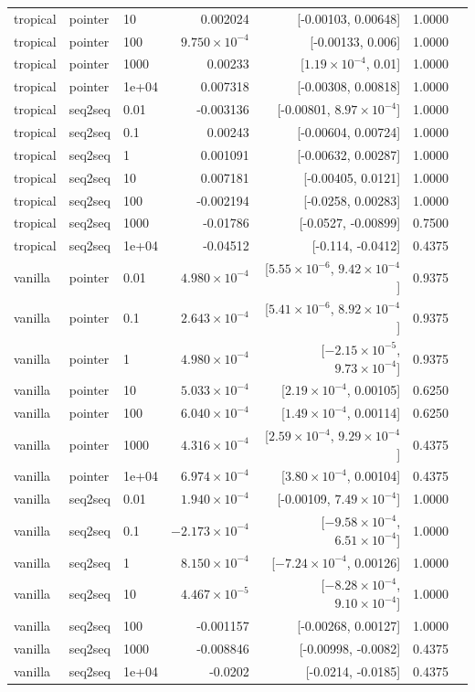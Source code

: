 \documentclass[10pt]{article}
\begin{document}
{\begin{longtable}{lllrrrl}
tropical & pointer & 10 & 0.002024 & [-0.00103, 0.00648] & 1.0000 & \\
tropical & pointer & 100 & $9.750\times10^{-4}$ & [-0.00133, 0.006] & 1.0000 & \\
tropical & pointer & 1000 & 0.00233 & [$1.19\times10^{-4}$, 0.01] & 1.0000 & \\
tropical & pointer & 1e+04 & 0.007318 & [-0.00308, 0.00818] & 1.0000 & \\
tropical & seq2seq & 0.01 & -0.003136 & [-0.00801, $8.97\times10^{-4}$] & 1.0000 & \\
tropical & seq2seq & 0.1 & 0.00243 & [-0.00604, 0.00724] & 1.0000 & \\
tropical & seq2seq & 1 & 0.001091 & [-0.00632, 0.00287] & 1.0000 & \\
tropical & seq2seq & 10 & 0.007181 & [-0.00405, 0.0121] & 1.0000 & \\
tropical & seq2seq & 100 & -0.002194 & [-0.0258, 0.00283] & 1.0000 & \\
tropical & seq2seq & 1000 & -0.01786 & [-0.0527, -0.00899] & 0.7500 & \\
tropical & seq2seq & 1e+04 & -0.04512 & [-0.114, -0.0412] & 0.4375 & \\
vanilla & pointer & 0.01 & $4.980\times10^{-4}$ & [$5.55\times10^{-6}$, $9.42\times10^{-4}$] & 0.9375 & \\
vanilla & pointer & 0.1 & $2.643\times10^{-4}$ & [$5.41\times10^{-6}$, $8.92\times10^{-4}$] & 0.9375 & \\
vanilla & pointer & 1 & $4.980\times10^{-4}$ & [$-2.15\times10^{-5}$, $9.73\times10^{-4}$] & 0.9375 & \\
vanilla & pointer & 10 & $5.033\times10^{-4}$ & [$2.19\times10^{-4}$, 0.00105] & 0.6250 & \\
vanilla & pointer & 100 & $6.040\times10^{-4}$ & [$1.49\times10^{-4}$, 0.00114] & 0.6250 & \\
vanilla & pointer & 1000 & $4.316\times10^{-4}$ & [$2.59\times10^{-4}$, $9.29\times10^{-4}$] & 0.4375 & \\
vanilla & pointer & 1e+04 & $6.974\times10^{-4}$ & [$3.80\times10^{-4}$, 0.00104] & 0.4375 & \\
vanilla & seq2seq & 0.01 & $1.940\times10^{-4}$ & [-0.00109, $7.49\times10^{-4}$] & 1.0000 & \\
vanilla & seq2seq & 0.1 & $-2.173\times10^{-4}$ & [$-9.58\times10^{-4}$, $6.51\times10^{-4}$] & 1.0000 & \\
vanilla & seq2seq & 1 & $8.150\times10^{-4}$ & [$-7.24\times10^{-4}$, 0.00126] & 1.0000 & \\
vanilla & seq2seq & 10 & $4.467\times10^{-5}$ & [$-8.28\times10^{-4}$, $9.10\times10^{-4}$] & 1.0000 & \\
vanilla & seq2seq & 100 & -0.001157 & [-0.00268, 0.00127] & 1.0000 & \\
vanilla & seq2seq & 1000 & -0.008846 & [-0.00998, -0.0082] & 0.4375 & \\
vanilla & seq2seq & 1e+04 & -0.0202 & [-0.0214, -0.0185] & 0.4375 & \\
\bottomrule
\end{longtable}
}
\end{document}
